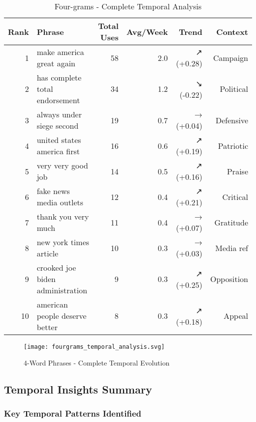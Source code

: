 \documentclass[12pt,a4paper]{article}
\begin{document}
\begin{table}[H]
\centering
\caption{Four-grams - Complete Temporal Analysis}
\begin{tabular}{@{}rlrrrr@{}}
\toprule
\textbf{Rank} & \textbf{Phrase} & \textbf{Total Uses} & \textbf{Avg/Week} & \textbf{Trend} & \textbf{Context} \\
\midrule
1 & make america great again & 58 & 2.0 & ↗ (+0.28) & Campaign \\
2 & has complete total endorsement & 34 & 1.2 & ↘ (-0.22) & Political \\
3 & always under siege second & 19 & 0.7 & → (+0.04) & Defensive \\
4 & united states america first & 16 & 0.6 & ↗ (+0.19) & Patriotic \\
5 & very very good job & 14 & 0.5 & ↗ (+0.16) & Praise \\
6 & fake news media outlets & 12 & 0.4 & ↗ (+0.21) & Critical \\
7 & thank you very much & 11 & 0.4 & → (+0.07) & Gratitude \\
8 & new york times article & 10 & 0.3 & → (+0.03) & Media ref \\
9 & crooked joe biden administration & 9 & 0.3 & ↗ (+0.25) & Opposition \\
10 & american people deserve better & 8 & 0.3 & ↗ (+0.18) & Appeal \\
\bottomrule
\end{tabular}
\end{table}

\begin{figure}[H]
\centering
\texttt{[image: fourgrams\_temporal\_analysis.svg]}
\caption{4-Word Phrases - Complete Temporal Evolution}
\label{fig:fourgrams_temporal}
\end{figure}

\subsection{Temporal Insights Summary}

\subsubsection{Key Temporal Patterns Identified}
\end{document}
